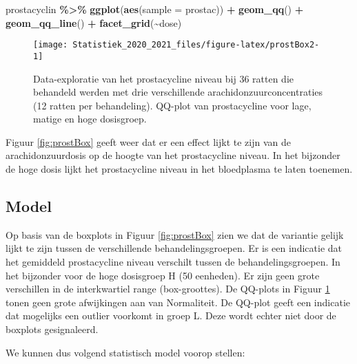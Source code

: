 \documentclass[
  12pt,dutch,coursenotes]{book}
\newenvironment{Shaded}{\begin{snugshade}}{\end{snugshade}}
\newcommand{\DataTypeTok}[1]{\textcolor[rgb]{0.13,0.29,0.53}{#1}}
\newcommand{\KeywordTok}[1]{\textcolor[rgb]{0.13,0.29,0.53}{\textbf{#1}}}
\newcommand{\NormalTok}[1]{#1}
\newcommand{\OperatorTok}[1]{\textcolor[rgb]{0.81,0.36,0.00}{\textbf{#1}}}
\newcommand{\StringTok}[1]{\textcolor[rgb]{0.31,0.60,0.02}{#1}}
\theoremstyle{definition}
\theoremstyle{definition}
\theoremstyle{definition}
\theoremstyle{remark}
\begin{document}
\begin{Shaded}
\begin{Highlighting}[]
\NormalTok{prostacyclin }\OperatorTok{\%\textgreater{}\%}\StringTok{ }\KeywordTok{ggplot}\NormalTok{(}\KeywordTok{aes}\NormalTok{(}\DataTypeTok{sample =}\NormalTok{ prostac)) }\OperatorTok{+}\StringTok{ }\KeywordTok{geom\_qq}\NormalTok{() }\OperatorTok{+}\StringTok{ }
\StringTok{    }\KeywordTok{geom\_qq\_line}\NormalTok{() }\OperatorTok{+}\StringTok{ }\KeywordTok{facet\_grid}\NormalTok{(}\OperatorTok{\textasciitilde{}}\NormalTok{dose)}
\end{Highlighting}
\end{Shaded}

\begin{figure}

{\centering \texttt{[image: Statistiek\_2020\_2021\_files/figure-latex/prostBox2-1]} 

}

\caption{Data-exploratie van het prostacycline niveau bij 36 ratten die behandeld werden met drie verschillende arachidonzuurconcentraties (12 ratten per behandeling). QQ-plot van prostacycline voor lage, matige en hoge dosisgroep.}\label{fig:prostBox2}
\end{figure}

Figuur \ref{fig:prostBox} geeft weer dat er een effect lijkt te zijn van de arachidonzuurdosis op de hoogte van het prostacycline niveau.
In het bijzonder de hoge dosis lijkt het prostacycline niveau in het bloedplasma te laten toenemen.

\hypertarget{model-1}{%
\subsection{Model}\label{model-1}}

Op basis van de boxplots in Figuur \ref{fig:prostBox} zien we dat de variantie gelijk lijkt te zijn tussen de verschillende behandelingsgroepen.
Er is een indicatie dat het gemiddeld prostacycline niveau verschilt tussen de behandelingsgroepen.
In het bijzonder voor de hoge dosisgroep H (50 eenheden).
Er zijn geen grote verschillen in de interkwartiel range (box-groottes).
De QQ-plots in Figuur \ref{fig:prostBox2} tonen geen grote afwijkingen aan van Normaliteit.
De QQ-plot geeft een indicatie dat mogelijks een outlier voorkomt in groep L.
Deze wordt echter niet door de boxplots gesignaleerd.

We kunnen dus volgend statistisch model voorop stellen:
\end{document}
